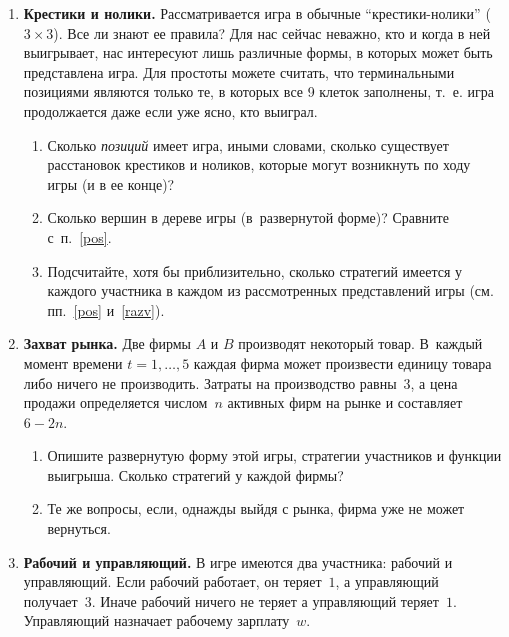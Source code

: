 \documentclass[a4paper,12pt]{article}
\begin{document}
\begin{enumerate}

\item {\bf Крестики и нолики.} Рассматривается игра в
обычные ``крестики-нолики'' (${3\times 3}$). Все ли знают
ее правила? Для нас сейчас неважно, кто и когда в ней
выигрывает, нас интересуют лишь различные формы, в которых
может быть представлена игра. Для простоты можете считать,
что терминальными позициями являются только те, в которых
все 9 клеток заполнены, т.~е. игра продолжается даже если
уже ясно, кто выиграл.

\begin{enumerate}

\item\label{pos} Сколько {\it позиций} имеет игра, иными
словами, сколько существует расстановок крестиков и
ноликов, которые могут возникнуть по ходу игры (и в ее
конце)?

\item\label{razv} Сколько вершин в дереве игры
(в~развернутой форме)?  Сравните с~п.~\ref{pos}.

\item Подсчитайте, хотя бы приблизительно, сколько
стратегий имеется у каждого участника в каждом из
рассмотренных представлений игры (см. пп.~\ref{pos}
и~\ref{razv}).

\end{enumerate}

\item {\bf Захват рынка.} Две фирмы $A$ и $B$ производят
некоторый товар. В~каждый момент времени $t=1,\ldots,5$
каждая фирма может произвести единицу товара либо ничего не
производить. Затраты на производство равны~$3$, а цена
продажи определяется числом~$n$ активных фирм на рынке и
составляет~$6-2n$.

\begin{enumerate}

\item Опишите развернутую форму этой игры, стратегии
участников и функции выигрыша. Сколько стратегий у каждой
фирмы?

\item Те же вопросы, если, однажды выйдя с рынка, фирма уже
не может вернуться.

\end{enumerate}

\item {\bf Рабочий и управляющий.} В игре имеются два
участника: рабочий и управляющий. Если рабочий работает, он
теряет~$1$, а управляющий получает~$3$. Иначе рабочий
ничего не теряет а управляющий теряет~$1$. Управляющий
назначает рабочему зарплату~$w$.


\end{enumerate}
\end{document}
